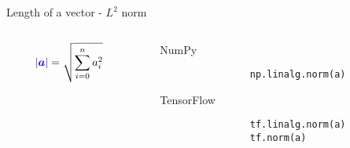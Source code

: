 \documentclass[handout]{beamer}
\begin{document}
\begin{frame}[fragile]{Length of a vector - $L^2$ norm}
    \begin{columns}
        \begin{column}{0.5\textwidth}
        \huge
            \begin{align*}
                \textcolor{blue}{|\boldsymbol{a}|} &= \sqrt{\sum^{n}_{i=0} a_i^2}
            \end{align*}
        \end{column}
        \begin{column}{0.5\textwidth}
            \begin{alertblock}{NumPy}
                \begin{lstlisting}
                np.linalg.norm(a)
                \end{lstlisting}
            \end{alertblock}
            \begin{alertblock}{TensorFlow}
                \begin{lstlisting}
                tf.linalg.norm(a)
                tf.norm(a)
                \end{lstlisting}
            \end{alertblock}
        \end{column}
    \end{columns}
\end{frame}
\end{document}
